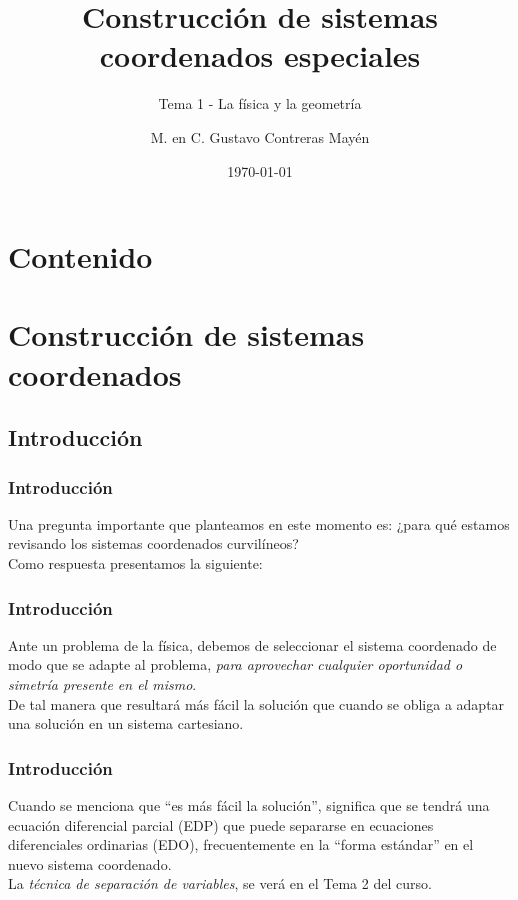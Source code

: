
\title{\large{Construcción de sistemas coordenados especiales}}
\subtitle{Tema 1 - La física y la geometría}
\author{M. en C. Gustavo Contreras Mayén}
\date{\today}

\maketitle
\fontsize{14}{14}\selectfont
{}
\section*{Contenido}
\section{Construcción de sistemas coordenados}
\subsection{Introducción}
\begin{frame}
\frametitle{Introducción}
Una pregunta importante que planteamos en este momento es: ¿para qué estamos revisando los sistemas coordenados curvilíneos?
\\
\bigskip
\pause
Como respuesta presentamos la siguiente:
\end{frame}
\begin{frame}
\frametitle{Introducción}
Ante un problema de la física, debemos de seleccionar el sistema coordenado de modo que se adapte al problema, \emph{para aprovechar cualquier oportunidad o simetría presente en el mismo}.
\\
\bigskip
\pause
De tal manera que resultará más fácil la solución que cuando se obliga a adaptar una solución en un sistema cartesiano.
\end{frame}
\begin{frame}
\frametitle{Introducción}
Cuando se menciona que \enquote{es más fácil la solución}, significa que se tendrá una ecuación diferencial parcial (EDP) que puede separarse en ecuaciones diferenciales ordinarias (EDO), frecuentemente en la \enquote{forma estándar} en el nuevo sistema coordenado.
\\
\bigskip
\pause
La \emph{técnica de separación de variables}, se verá en el Tema 2 del curso.
\end{frame}
